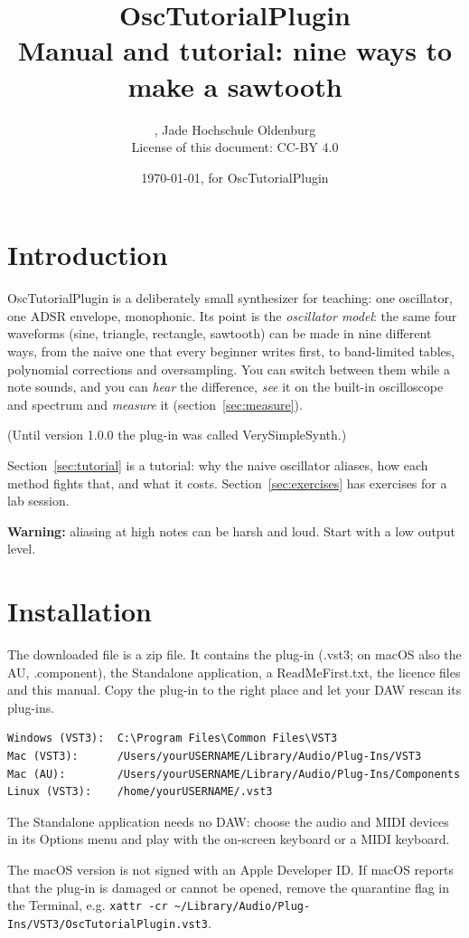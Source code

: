 \documentclass[11pt]{article}
\title{OscTutorialPlugin\\[1ex]\large Manual and tutorial: nine ways to make a sawtooth}
\author{\pluginauthor, Jade Hochschule Oldenburg\\License of this document: CC-BY 4.0}
\date{\today, for OscTutorialPlugin \pluginversion}
\begin{document}
\maketitle

\tableofcontents

\section{Introduction}
OscTutorialPlugin is a deliberately small synthesizer for teaching: one oscillator, one ADSR envelope,
monophonic. Its point is the \emph{oscillator model}: the same four waveforms (sine, triangle,
rectangle, sawtooth) can be made in nine different ways, from the naive one that every beginner
writes first, to band-limited tables, polynomial corrections and oversampling. You can switch
between them while a note sounds, and you can \emph{hear} the difference, \emph{see} it on the
built-in oscilloscope and spectrum and \emph{measure} it (section~\ref{sec:measure}).

(Until version 1.0.0 the plug-in was called VerySimpleSynth.)

Section~\ref{sec:tutorial} is a tutorial: why the naive oscillator aliases, how each method fights
that, and what it costs. Section~\ref{sec:exercises} has exercises for a lab session.

\textbf{Warning:} aliasing at high notes can be harsh and loud. Start with a low output level.

\section{Installation}
The downloaded file is a zip file. It contains the plug-in (.vst3; on macOS also the AU,
.component), the Standalone application, a ReadMeFirst.txt, the licence files and this manual.
Copy the plug-in to the right place and let your DAW rescan its plug-ins.

\begin{verbatim}
Windows (VST3):  C:\Program Files\Common Files\VST3
Mac (VST3):      /Users/yourUSERNAME/Library/Audio/Plug-Ins/VST3
Mac (AU):        /Users/yourUSERNAME/Library/Audio/Plug-Ins/Components
Linux (VST3):    /home/yourUSERNAME/.vst3
\end{verbatim}

The Standalone application needs no DAW: choose the audio and MIDI devices in its Options menu and
play with the on-screen keyboard or a MIDI keyboard.

The macOS version is not signed with an Apple Developer ID. If macOS reports that the plug-in
is damaged or cannot be opened, remove the quarantine flag in the Terminal, e.g.
\texttt{xattr -cr \textasciitilde/Library/Audio/Plug-Ins/VST3/OscTutorialPlugin.vst3}.
\end{document}
